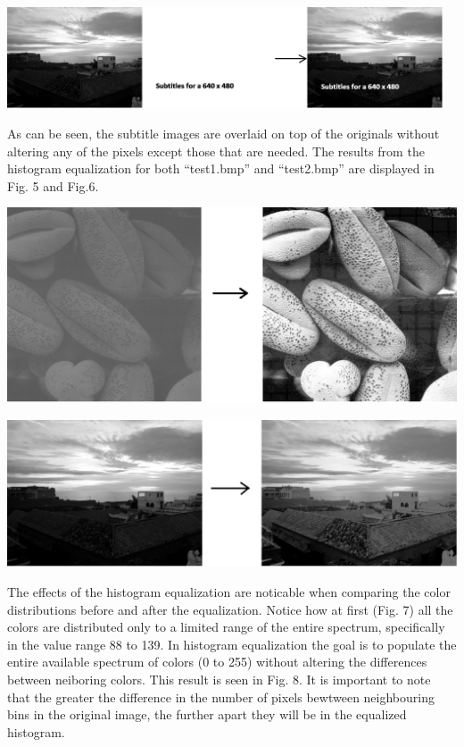 \documentclass{article}
\newenvironment{Figure}
  {\par\medskip\noindent\ignorespaces\minipage{\linewidth}}
  {\endminipage\par\medskip}
\begin{document}
\begin{multicols*}{2}
\begin{Figure}
 \centering
 \includegraphics[height=3cm,width=\linewidth]{sample2.png}
\end{Figure}



As can be seen, the subtitle images are overlaid on top of the originals without altering any of the pixels except those that are needed.
The results from the histogram equalization for both “test1.bmp” and “test2.bmp” are displayed in Fig. 5 and Fig.6. 


\begin{Figure}
 \centering
\includegraphics[width=\linewidth]{equal1.png}
\end{Figure}


\begin{Figure}
 \centering
 \includegraphics[width=\linewidth]{equal2.png}
\end{Figure}

The effects of the histogram equalization are noticable when comparing the color distributions before and after the equalization. Notice how at first (Fig. 7) all the colors are distributed only to a limited range of the entire spectrum, specifically in the value range 88 to 139. In histogram equalization the goal is to populate the entire available spectrum of colors (0 to 255) without altering the differences between neiboring colors. This result is seen in Fig. 8. It is important to note that the greater the difference in the number of pixels bewtween neighbouring bins in the original image, the further apart they will be in the equalized histogram. 



\end{multicols*}
\end{document}
